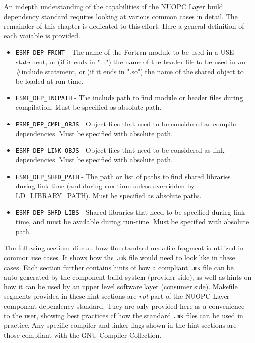 An indepth understanding of the capabilities of the NUOPC Layer build dependency standard requires looking at various common cases in detail. The remainder of this chapter is dedicated to this effort. Here a general definition of each variable is provided.

\begin{itemize}

\item {\tt ESMF\_DEP\_FRONT} - The name of the Fortran module to be used in a USE statement, or (if it ends in ".h") the name of the header file to be used in an \#include statement, or (if it ends in ".so") the name of the shared object to be loaded at run-time.

\item {\tt ESMF\_DEP\_INCPATH} - The include path to find module or header files during compilation. Must be specified as absolute path.

\item {\tt ESMF\_DEP\_CMPL\_OBJS} - Object files that need to be considered as compile dependencies. Must be specified with absolute path.

\item {\tt ESMF\_DEP\_LINK\_OBJS} - Object files that need to be considered as link dependencies. Must be specified with absolute path.

\item {\tt ESMF\_DEP\_SHRD\_PATH} - The path or list of paths to find shared libraries during link-time (and during run-time unless overridden by LD\_LIBRARY\_PATH). Must be specified as absolute paths.

\item {\tt ESMF\_DEP\_SHRD\_LIBS} - Shared libraries that need to be specified during link-time, and must be available during run-time. Must be specified with absolute path.

\end{itemize}

The following sections discuss how the standard makefile fragment is utilized in common use cases. It shows how the {\tt .mk} file would need to look like in these cases. Each section further contains hints of how a compliant {\tt .mk} file can be auto-generated by the component build system (provider side), as well as hints on how it can be used by an upper level software layer (consumer side). Makefile segments provided in these hint sections are {\em not} part of the NUOPC Layer component dependency standard. They are only provided here as a convenience to the user, showing best practices of how the standard {\tt .mk} files can be used in practice. Any specific compiler and linker flags shown in the hint sections are those compliant with the GNU Compiler Collection. 

